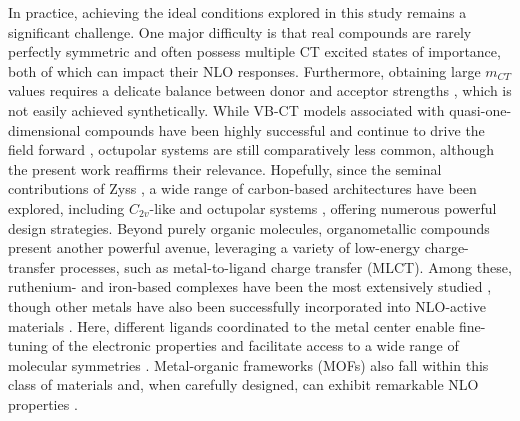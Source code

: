 \documentclass[journal=jpcafh]{achemso}
\begin{document}
In practice, achieving the ideal conditions explored in this study remains a significant challenge. One major difficulty is that real compounds are rarely perfectly symmetric and often possess multiple CT excited states of importance\cite{zhangTheoreticalInvestigationFirst2013}, both of which can impact their NLO responses. Furthermore, obtaining large $m_{CT}$ values requires a delicate balance between donor and acceptor strengths \cite{beaujeanUnravelingSymmetryEffects2022,postilsSecondorderNonlinearOptical2024}, which is not easily achieved synthetically.
While VB-CT models associated with quasi-one-dimensional compounds have been highly successful \cite{bourhillExperimentalDemonstrationDependence1994,daltonOrganicElectroOpticsPhotonics2015,wuHighperformanceOrganicSecond2020} and continue to drive the field forward \cite{dalton25YearsOrganic2019,dubuisNonlinearOpticalResponses2023,dellaiDynamicEffectsNonlinear2024}, octupolar systems are still comparatively less common, although the present work reaffirms their relevance. Hopefully, since the seminal contributions of Zyss \cite{zyssMolecularEngineeringImplications1993}, a wide range of carbon-based architectures have been explored, including $C_{2v}$-like \cite{yangLargeOffDiagonalContribution2003,castetSecondorderNonlinearOptical2021,postilsSecondorderNonlinearOptical2024} and octupolar systems \cite{choElementaryDescriptionNonlinear1998,panjaSumoverstateSchemeAnalysis2010,beaujeanMultiStateSecondOrderNonlinear2022}, offering numerous powerful design strategies.
Beyond purely organic molecules, organometallic compounds present another powerful avenue, leveraging a variety of low-energy charge-transfer processes, such as metal-to-ligand charge transfer (MLCT). Among these, ruthenium- and iron-based complexes have been the most extensively studied \cite{coeDevelopingIronRuthenium2013,ashcroftMolecularEngineeringOrganic2019}, though other metals have also been successfully incorporated into NLO-active materials \cite{costesSynthesisCrystalStructures2005,lamereSynthesisCharacterizationNonlinear2006,lacroixSecondorderNonlinearOptics2016}. Here, different ligands coordinated to the metal center enable fine-tuning of the electronic properties and facilitate access to a wide range of molecular symmetries \cite{ashcroftMolecularEngineeringOrganic2019,beaujeanUnravelingSymmetryEffects2022,hoodSynthesisOpticalNonlinear2024}. Metal-organic frameworks (MOFs) also fall within this class of materials and, when carefully designed, can exhibit remarkable NLO properties \cite{medishettyNonlinearOpticalProperties2017,chengNonlinearOpticalProperties2021}.
\end{document}

